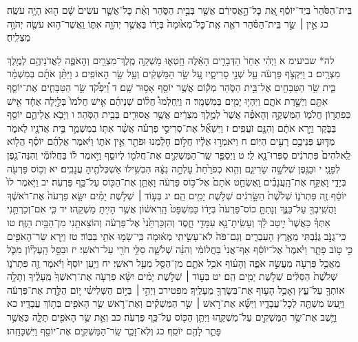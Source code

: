 \documentclass[twoside, openany, parskip=half, 11pt]{book}
\begin{document}
בֵּית־הַסֹּ֙הַר֙ בְּיַד־יוֹסֵ֔ף אֵ֚ת כׇּל־הָ֣אֲסִירִ֔ם אֲשֶׁ֖ר בְּבֵ֣ית הַסֹּ֑הַר וְאֵ֨ת כׇּל־אֲשֶׁ֤ר עֹשִׂים֙ שָׁ֔ם ה֖וּא הָיָ֥ה עֹשֶֽׂה׃ כג אֵ֣ין ׀ שַׂ֣ר בֵּית־הַסֹּ֗הַר רֹאֶ֤ה אֶֽת־כׇּל־מְא֙וּמָה֙ בְּיָד֔וֹ בַּאֲשֶׁ֥ר יְהֹוָ֖ה אִתּ֑וֹ וַֽאֲשֶׁר־ה֥וּא עֹשֶׂ֖ה יְהֹוָ֥ה מַצְלִֽיחַ׃

לה* שביעימ א וַיְהִ֗י אַחַר֙ הַדְּבָרִ֣ים הָאֵ֔לֶּה חָ֥טְא֛וּ מַשְׁקֵ֥ה מֶֽלֶךְ־מִצְרַ֖יִם וְהָאֹפֶ֑ה לַאֲדֹנֵיהֶ֖ם לְמֶ֥לֶךְ מִצְרָֽיִם׃ ב וַיִּקְצֹ֣ף פַּרְעֹ֔ה עַ֖ל שְׁנֵ֣י סָרִיסָ֑יו עַ֚ל שַׂ֣ר הַמַּשְׁקִ֔ים וְעַ֖ל שַׂ֥ר הָאוֹפִֽים׃ ג וַיִּתֵּ֨ן אֹתָ֜ם בְּמִשְׁמַ֗ר בֵּ֛ית שַׂ֥ר הַטַּבָּחִ֖ים אֶל־בֵּ֣ית הַסֹּ֑הַר מְק֕וֹם אֲשֶׁ֥ר יוֹסֵ֖ף אָס֥וּר שָֽׁם׃ ד וַ֠יִּפְקֹ֠ד שַׂ֣ר הַטַּבָּחִ֧ים אֶת־יוֹסֵ֛ף אִתָּ֖ם וַיְשָׁ֣רֶת אֹתָ֑ם וַיִּהְי֥וּ יָמִ֖ים בְּמִשְׁמָֽר׃ ה וַיַּֽחַלְמוּ֩ חֲל֨וֹם שְׁנֵיהֶ֜ם אִ֤ישׁ חֲלֹמוֹ֙ בְּלַ֣יְלָה אֶחָ֔ד אִ֖ישׁ כְּפִתְר֣וֹן חֲלֹמ֑וֹ הַמַּשְׁקֶ֣ה וְהָאֹפֶ֗ה אֲשֶׁר֙ לְמֶ֣לֶךְ מִצְרַ֔יִם אֲשֶׁ֥ר אֲסוּרִ֖ים בְּבֵ֥ית הַסֹּֽהַר׃ ו וַיָּבֹ֧א אֲלֵיהֶ֛ם יוֹסֵ֖ף בַּבֹּ֑קֶר וַיַּ֣רְא אֹתָ֔ם וְהִנָּ֖ם זֹעֲפִֽים׃ ז וַיִּשְׁאַ֞ל אֶת־סְרִיסֵ֣י פַרְעֹ֗ה אֲשֶׁ֨ר אִתּ֧וֹ בְמִשְׁמַ֛ר בֵּ֥ית אֲדֹנָ֖יו לֵאמֹ֑ר מַדּ֛וּעַ פְּנֵיכֶ֥ם רָעִ֖ים הַיּֽוֹם׃ ח וַיֹּאמְר֣וּ אֵלָ֔יו חֲל֣וֹם חָלַ֔מְנוּ וּפֹתֵ֖ר אֵ֣ין אֹת֑וֹ וַיֹּ֨אמֶר אֲלֵהֶ֜ם יוֹסֵ֗ף הֲל֤וֹא לֵֽאלֹהִים֙ פִּתְרֹנִ֔ים סַפְּרוּ־נָ֖א לִֽי׃ ט וַיְסַפֵּ֧ר שַֽׂר־הַמַּשְׁקִ֛ים אֶת־חֲלֹמ֖וֹ לְיוֹסֵ֑ף וַיֹּ֣אמֶר ל֔וֹ בַּחֲלוֹמִ֕י וְהִנֵּה־גֶ֖פֶן לְפָנָֽי׃ י וּבַגֶּ֖פֶן שְׁלֹשָׁ֣ה שָׂרִיגִ֑ם וְהִ֤וא כְפֹרַ֙חַת֙ עָלְתָ֣ה נִצָּ֔הּ הִבְשִׁ֥ילוּ אַשְׁכְּלֹתֶ֖יהָ עֲנָבִֽים׃ יא וְכ֥וֹס פַּרְעֹ֖ה בְּיָדִ֑י וָאֶקַּ֣ח אֶת־הָֽעֲנָבִ֗ים וָֽאֶשְׂחַ֤ט אֹתָם֙ אֶל־כּ֣וֹס פַּרְעֹ֔ה וָאֶתֵּ֥ן אֶת־הַכּ֖וֹס עַל־כַּ֥ף פַּרְעֹֽה׃ יב וַיֹּ֤אמֶר לוֹ֙ יוֹסֵ֔ף זֶ֖ה פִּתְרֹנ֑וֹ שְׁלֹ֙שֶׁת֙ הַשָּׂ֣רִגִ֔ים שְׁלֹ֥שֶׁת יָמִ֖ים הֵֽם׃ יג בְּע֣וֹד ׀ שְׁלֹ֣שֶׁת יָמִ֗ים יִשָּׂ֤א פַרְעֹה֙ אֶת־רֹאשֶׁ֔ךָ וַהֲשִֽׁיבְךָ֖ עַל־כַּנֶּ֑ךָ וְנָתַתָּ֤ כוֹס־פַּרְעֹה֙ בְּיָד֔וֹ כַּמִּשְׁפָּט֙ הָֽרִאשׁ֔וֹן אֲשֶׁ֥ר הָיִ֖יתָ מַשְׁקֵֽהוּ׃ יד כִּ֧י אִם־זְכַרְתַּ֣נִי אִתְּךָ֗ כַּאֲשֶׁר֙ יִ֣יטַב לָ֔ךְ וְעָשִֽׂיתָ־נָּ֥א עִמָּדִ֖י חָ֑סֶד וְהִזְכַּרְתַּ֙נִי֙ אֶל־פַּרְעֹ֔ה וְהוֹצֵאתַ֖נִי מִן־הַבַּ֥יִת הַזֶּֽה׃ טו כִּֽי־גֻנֹּ֣ב גֻּנַּ֔בְתִּי מֵאֶ֖רֶץ הָעִבְרִ֑ים וְגַם־פֹּה֙ לֹא־עָשִׂ֣יתִֽי מְא֔וּמָה כִּֽי־שָׂמ֥וּ אֹתִ֖י בַּבּֽוֹר׃ טז וַיַּ֥רְא שַׂר־הָאֹפִ֖ים כִּ֣י ט֣וֹב פָּתָ֑ר וַיֹּ֙אמֶר֙ אֶל־יוֹסֵ֔ף אַף־אֲנִי֙ בַּחֲלוֹמִ֔י וְהִנֵּ֗ה שְׁלֹשָׁ֛ה סַלֵּ֥י חֹרִ֖י עַל־רֹאשִֽׁי׃ יז וּבַסַּ֣ל הָֽעֶלְי֗וֹן מִכֹּ֛ל מַאֲכַ֥ל פַּרְעֹ֖ה מַעֲשֵׂ֣ה אֹפֶ֑ה וְהָע֗וֹף אֹכֵ֥ל אֹתָ֛ם מִן־הַסַּ֖ל מֵעַ֥ל רֹאשִֽׁי׃ יח וַיַּ֤עַן יוֹסֵף֙ וַיֹּ֔אמֶר זֶ֖ה פִּתְרֹנ֑וֹ שְׁלֹ֙שֶׁת֙ הַסַּלִּ֔ים שְׁלֹ֥שֶׁת יָמִ֖ים הֵֽם׃ יט בְּע֣וֹד ׀ שְׁלֹ֣שֶׁת יָמִ֗ים יִשָּׂ֨א פַרְעֹ֤ה אֶת־רֹֽאשְׁךָ֙ מֵֽעָלֶ֔יךָ וְתָלָ֥ה אוֹתְךָ֖ עַל־עֵ֑ץ וְאָכַ֥ל הָע֛וֹף אֶת־בְּשָׂרְךָ֖ מֵעָלֶֽיךָ׃ מפטירכ וַיְהִ֣י ׀ בַּיּ֣וֹם הַשְּׁלִישִׁ֗י י֚וֹם הֻלֶּ֣דֶת אֶת־פַּרְעֹ֔ה וַיַּ֥עַשׂ מִשְׁתֶּ֖ה לְכׇל־עֲבָדָ֑יו וַיִּשָּׂ֞א אֶת־רֹ֣אשׁ ׀ שַׂ֣ר הַמַּשְׁקִ֗ים וְאֶת־רֹ֛אשׁ שַׂ֥ר הָאֹפִ֖ים בְּת֥וֹךְ עֲבָדָֽיו׃ כא וַיָּ֛שֶׁב אֶת־שַׂ֥ר הַמַּשְׁקִ֖ים עַל־מַשְׁקֵ֑הוּ וַיִּתֵּ֥ן הַכּ֖וֹס עַל־כַּ֥ף פַּרְעֹֽה׃ כב וְאֵ֛ת שַׂ֥ר הָאֹפִ֖ים תָּלָ֑ה כַּאֲשֶׁ֥ר פָּתַ֛ר לָהֶ֖ם יוֹסֵֽף׃ כג וְלֹֽא־זָכַ֧ר שַֽׂר־הַמַּשְׁקִ֛ים אֶת־יוֹסֵ֖ף וַיִּשְׁכָּחֵֽהוּ׃
\end{document}
